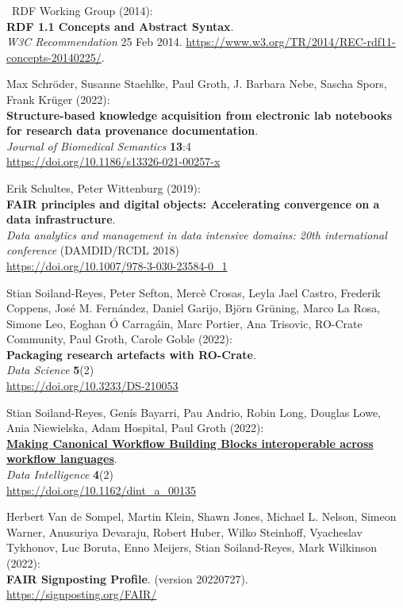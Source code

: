\begin{thebibliography}{9}
~RDF Working Group (2014):\\
\textbf{RDF 1.1 Concepts and Abstract Syntax}.\\
\emph{W3C Recommendation} 25 Feb 2014.
\url{https://www.w3.org/TR/2014/REC-rdf11-concepts-20140225/}.

 Max Schröder, Susanne Staehlke, Paul Groth, J.
Barbara Nebe, Sascha Spors, Frank Krüger (2022):\\
\textbf{Structure-based knowledge acquisition from electronic lab
notebooks for research data provenance documentation}.\\
\emph{Journal of Biomedical Semantics} \textbf{13}:4\\
\url{https://doi.org/10.1186/s13326-021-00257-x}

 Erik Schultes, Peter Wittenburg (2019):\\
\textbf{FAIR principles and digital objects: Accelerating convergence on
a data infrastructure}.\\
\emph{Data analytics and management in data intensive domains: 20th
international conference} (DAMDID/RCDL 2018)\\
\url{https://doi.org/10.1007/978-3-030-23584-0_1}

 Stian Soiland-Reyes, Peter Sefton, Mercè
Crosas, Leyla Jael Castro, Frederik Coppens, José M. Fernández, Daniel
Garijo, Björn Grüning, Marco La Rosa, Simone Leo, Eoghan Ó Carragáin,
Marc Portier, Ana Trisovic, RO-Crate Community, Paul Groth, Carole Goble
(2022):\\
\textbf{Packaging research artefacts with RO-Crate}.\\
\emph{Data Science} \textbf{5}(2)\\
\url{https://doi.org/10.3233/DS-210053}

 Stian Soiland-Reyes, Genís Bayarri, Pau
Andrio, Robin Long, Douglas Lowe, Ania Niewielska, Adam Hospital, Paul
Groth (2022):\\
\href{../canonical-workflow-building-blocks/}{\textbf{Making Canonical
Workflow Building Blocks interoperable across workflow languages}}.\\
\emph{Data Intelligence} \textbf{4}(2)\\
\url{https://doi.org/10.1162/dint_a_00135}

 Herbert Van de Sompel, Martin Klein, Shawn
Jones, Michael L. Nelson, Simeon Warner, Anusuriya Devaraju, Robert
Huber, Wilko Steinhoff, Vyacheslav Tykhonov, Luc Boruta, Enno Meijers,
Stian Soiland-Reyes, Mark Wilkinson (2022):\\
\textbf{FAIR Signposting Profile}. (version 20220727).\\
\url{https://signposting.org/FAIR/}


\end{thebibliography}
